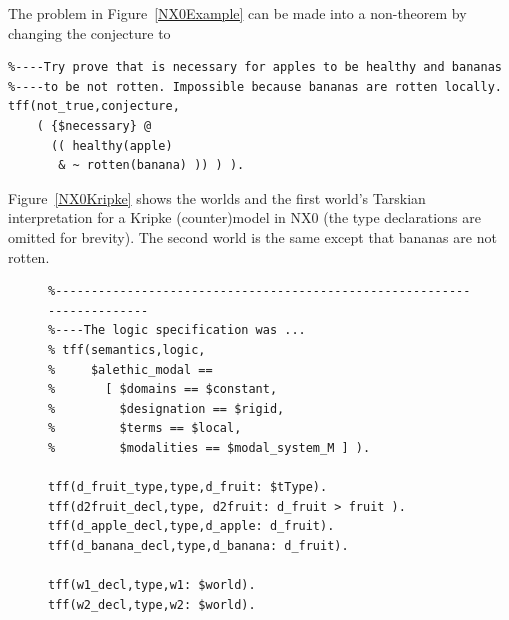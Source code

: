 \documentclass{ceurart}
\begin{document}
The problem in Figure~\ref{NX0Example} can be made into a non-theorem by changing the conjecture
to
\begin{verbatim}
%----Try prove that is necessary for apples to be healthy and bananas 
%----to be not rotten. Impossible because bananas are rotten locally.
tff(not_true,conjecture,
    ( {$necessary} @
      (( healthy(apple)
       & ~ rotten(banana) )) ) ).
\end{verbatim}
Figure~\ref{NX0Kripke} shows the worlds and the first world's Tarskian interpretation for 
a Kripke (counter)model in NX0 (the type declarations are omitted for brevity).
The second world is the same except that bananas are not rotten.

\begin{figure}[h!]
\small
{}
\begin{verbatim}
%------------------------------------------------------------------------
%----The logic specification was ...
% tff(semantics,logic,
%     $alethic_modal ==
%       [ $domains == $constant,
%         $designation == $rigid,
%         $terms == $local,
%         $modalities == $modal_system_M ] ).

tff(d_fruit_type,type,d_fruit: $tType).
tff(d2fruit_decl,type, d2fruit: d_fruit > fruit ).
tff(d_apple_decl,type,d_apple: d_fruit).
tff(d_banana_decl,type,d_banana: d_fruit).

tff(w1_decl,type,w1: $world).
tff(w2_decl,type,w2: $world).


\end{verbatim}
\end{figure}
\end{document}
